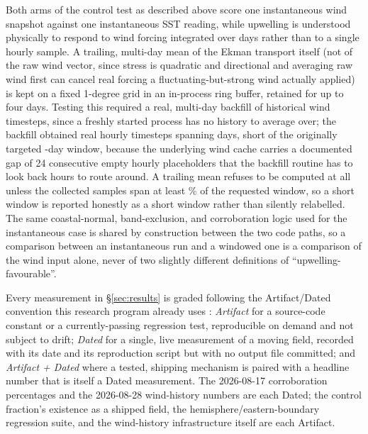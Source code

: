  Both arms of the control test as described
above score one instantaneous wind snapshot against one instantaneous SST
reading, while upwelling is understood physically to respond to wind forcing
integrated over days rather than to a single hourly sample. A trailing,
multi-day mean of the Ekman transport itself (not of the raw wind vector,
since stress is quadratic and directional and averaging raw wind first can
cancel real forcing a fluctuating-but-strong wind actually applied) is kept
on a fixed 1-degree grid in an in-process ring buffer, retained for up to
four days. Testing this required a real, multi-day backfill of historical
wind timesteps, since a freshly started process has no history to average
over; the backfill obtained \WindHistoryTimesteps{} real hourly timesteps
spanning \WindHistoryActualWindowDays{} days, short of the originally
targeted \WindHistoryTargetWindowDays{}-day window, because the underlying
wind cache carries a documented gap of 24 consecutive empty hourly
placeholders that the backfill routine has to look back \WindHistoryLookbackHours{}
hours to route around. A trailing mean refuses to be computed at all unless
the collected samples span at least \WindHistoryMinCoveragePct{}\% of the
requested window, so a short window is reported honestly as a short window
rather than silently relabelled. The same coastal-normal, band-exclusion,
and corroboration logic used for the instantaneous case is shared by
construction between the two code paths, so a comparison between an
instantaneous run and a windowed one is a comparison of the wind input
alone, never of two slightly different definitions of ``upwelling-favourable''.

 Every measurement in \S\ref{sec:results} is graded
following the Artifact/Dated convention this research program already uses
\citep{silentfailures2026}: \emph{Artifact} for a source-code constant or a
currently-passing regression test, reproducible on demand and not subject to
drift; \emph{Dated} for a single, live measurement of a moving field,
recorded with its date and its reproduction script but with no output file
committed; and \emph{Artifact + Dated} where a tested, shipping mechanism is
paired with a headline number that is itself a Dated measurement. The
2026-08-17 corroboration percentages and the 2026-08-28 wind-history numbers
are each Dated; the control fraction's existence as a shipped field, the
hemisphere/eastern-boundary regression suite, and the wind-history
infrastructure itself are each Artifact.

